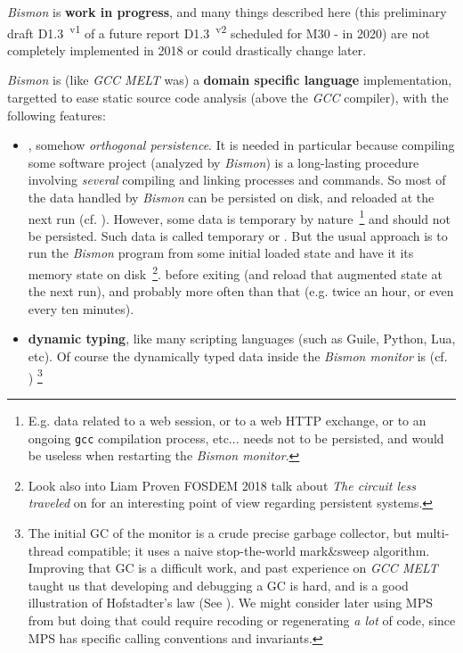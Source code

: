 \textit{Bismon} is \textbf{work in progress}, and many things
described here (this preliminary draft D1.3~\textsuperscript{v1} of a
future report D1.3~\textsuperscript{v2} scheduled for M30 - in 2020)
are not completely implemented in 2018 or could drastically change
later.

\bigskip

\textit{Bismon} is (like \textit{GCC MELT} was) a \textbf{domain
  specific language} implementation, targetted to ease static source
code analysis (above the \textit{GCC} compiler), with the following
features:

\begin{itemize}

  \item {}, somehow
    \textit{orthogonal persistence}. It is needed in particular
    because compiling some software project (analyzed by
    \textit{Bismon}) is a long-lasting procedure involving
    \textit{several} compiling and linking processes and commands. So
    most of the data handled by \textit{Bismon} can be persisted on
    disk, and reloaded at the next run
    (cf. \cite{Dearle-2010-orthopersist,
      Dearle:2009:OrthogonalPR}). However, some data is temporary by
    nature~\footnote{E.g. data related to a web session, or to a web
      HTTP exchange, or to an ongoing \texttt{gcc} compilation
      process, etc... needs not to be persisted, and would be useless
      when restarting the \textit{Bismon monitor}.} and should not be
    persisted. Such data is called temporary or
    . But the usual approach is
    to run the \textit{Bismon} program from some initial loaded state
    and have it  its memory state on
    disk~\footnote{Look also into Liam Proven FOSDEM 2018 talk about
      \emph{The circuit less traveled} on
      for an interesting point of view regarding persistent systems.}.
    before exiting (and reload that augmented state at the next run),
    and probably more often than that (e.g. twice an hour, or even
    every ten minutes).

  \item \textbf{dynamic typing}, like many scripting languages (such
    as Guile, Python, Lua, etc). Of course the dynamically typed data
    inside the \textit{Bismon monitor} is 
    (cf. \cite{Jones:2011:GC-handbook})
    \footnote{\label{fn:initial-gc}The initial GC of the monitor is a crude precise garbage
      collector, but multi-thread compatible; it uses a naive
      stop-the-world mark\&sweep algorithm. Improving that GC is a
      difficult work, and past experience on \emph{GCC MELT} taught us
      that developing and debugging a GC is hard, and is a good
      illustration of Hofstadter's law (See
      \cite{Hofstadter:1979:GEB}). We might consider later using MPS
      from  but doing
      that could require recoding or regenerating \emph{a lot} of code, since MPS has specific calling conventions and invariants.}


\end{itemize}
